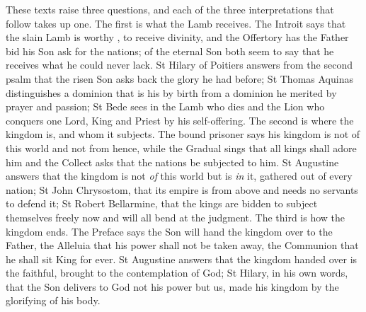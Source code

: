 These texts raise three questions, and each of the three interpretations that
follow takes up one. The first is what the Lamb receives. The Introit says that the
slain Lamb is worthy , to receive divinity,
and the Offertory has the Father bid his Son ask for the nations; of the
eternal Son both seem to say that he receives what he could never lack. St
Hilary of Poitiers answers from the second psalm that the risen Son asks back
the glory he had before; St Thomas Aquinas distinguishes a dominion that is
his by birth from a dominion he merited by prayer and passion; St Bede sees in
the Lamb who dies and the Lion who conquers one Lord, King and Priest by his
self-offering. The second is where the kingdom is, and whom it subjects. The
bound prisoner says his kingdom is not of this world and not from hence, while
the Gradual sings that all kings shall adore him and the Collect asks that the
nations be subjected to him. St Augustine answers that the kingdom is not
\emph{of} this world but is \emph{in} it, gathered out of every nation; St John
Chrysostom, that its empire is from above and needs no servants to defend it;
St Robert Bellarmine, that the kings are bidden to subject themselves freely
now and will all bend at the judgment. The third is how the kingdom ends. The
Preface says the Son will hand the kingdom over to the Father, the Alleluia
that his power shall not be taken away, the Communion that he shall sit King
for ever. St Augustine answers that the kingdom handed over is the faithful,
brought to the contemplation of God; St Hilary, in his own words, that the Son
delivers to God not his power but us, made his kingdom by the glorifying of his
body.


